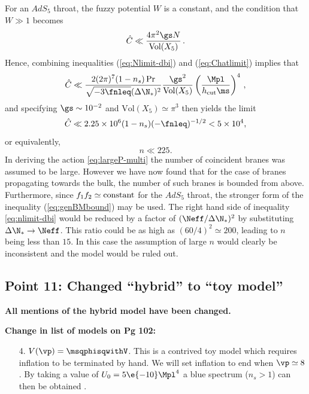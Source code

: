 For an $AdS_5$ throat, the fuzzy potential $W$ is a constant,
and the condition that $W \gg 1$ becomes 
% 
\begin{equation}
\label{eq:Chatlimit-corr}
\hat{C} \ll \frac{4\pi^2\gs N}{\mathrm{Vol}(X_5)} \,.
\end{equation}
% 
Hence, combining inequalities 
(\ref{eq:Nlimit-dbi}) and (\ref{eq:Chatlimit}) implies that
%  
\begin{equation}
\label{eq:nlimit-corr}
\hat{C} \ll 
\frac{2 (2\pi)^7 (1-n_s)\Pr}{\sqrt{-3\fnleq} ( \Delta \N_*)^2}
\frac{\gs^2}{\mathrm{Vol} (X_5) }
\left( \frac{\Mpl}{h_{\rm cut}\ms} \right)^4  \,,
\end{equation}
% 
and specifying $\gs \sim 10^{-2}$ and 
$\mathrm{Vol}(X_5) \simeq \pi^3$ then yields the limit  
% 
\begin{equation}
\hat{C} \ll 2.25\times 10^{6} (1-n_s)(-\fnleq)^{-1/2} < 5\times 10^4,
\end{equation}
% 
 or equivalently,
%   
\begin{equation}
\label{eq:nbound-corr}
n \ll 225.
\end{equation}
% 
In deriving the action \eqref{eq:largeP-multi} the number of coincident branes was assumed to be
large. However we have now found that for the case of branes propagating towards the bulk, the
number of such branes is bounded from above.
Furthermore, since $f_1f_2 \simeq {\rm constant}$ for the $AdS_5$ throat, 
the stronger form of the inequality (\ref{eq:genBMbound}) may be used. The right hand side of
inequality \eqref{eq:nlimit-dbi} would be reduced by a factor of $(   \Neff /\Delta \N_*)^2$ by
substituting 
$\Delta \N_* \rightarrow \Neff$. This ratio 
could be as high as $(60/4)^2 \simeq 200 $, leading to $n$ being less than $15$. In this case
the assumption of large $n$ would clearly be inconsistent and the model would be ruled out. 

\subsection{Point 11: Changed ``hybrid'' to ``toy model''}
\textbf{All mentions of the hybrid model have been changed.}

\textbf{Change in list of models on Pg 102:}
\begin{enumerate}
\item[4.] $V(\vp) = \msqphisqwithV$. This is a contrived toy model which requires inflation to
be terminated by hand. We will set inflation to end when $\vp \simeq 8$. By taking a value
of $U_0 = 5\e{-10}\Mpl^{4}$ a blue spectrum ($n_s>1$) can then be obtained
\cite{Linde:1993cn,Komatsu:2008hk}.
\end{enumerate}

